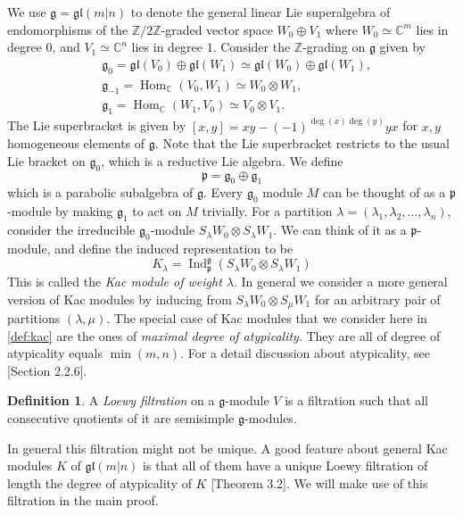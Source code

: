 \documentclass[12pt]{amsart}
\theoremstyle{definition}
\newtheorem{defn}[thm]{Definition}
\theoremstyle{remark}
\newcommand{\bbC}{\mathbb{C}}
\newcommand{\bbZ}{\mathbb{Z}}
\newcommand{\fg}{\mathfrak{g}}
\newcommand{\fp}{\mathfrak{p}}
\newcommand{\gl}{\mathfrak{gl}}
\newcommand{\Hom}{\operatorname{Hom}}
\newcommand{\Ind}{\operatorname{Ind}}
\numberwithin{equation}{section}
\begin{document}
We use $\fg = \gl(m|n)$ to denote the general linear Lie superalgebra of endomorphisms of the $\bbZ / 2 \bbZ$-graded vector space $W_0 \oplus V_1$ where $W_0 \simeq \bbC^m$ lies in degree $0$, and $V_1 \simeq \bbC^n$ lies in degree $1$. Consider the $\bbZ$-grading on $\fg$ given by
\begin{align*}
    & \fg_0 = \gl(V_0) \oplus \gl(W_1) \simeq \gl(W_0) \oplus \gl(W_1), \\
    & \fg_{-1} = \Hom_{\bbC}(V_0,W_1) \simeq W_0 \otimes W_1, \\
    & \fg_1 = \Hom_{\bbC}(W_1,V_0) \simeq V_0 \otimes V_1.
\end{align*}
The Lie superbracket is given by $[x,y] = xy - (-1)^{\deg(x)\deg(y)}yx$ for $x,y$ homogeneous elements of $\fg$. Note that the Lie superbracket restricts to the usual Lie bracket on $\fg_0$, which is a reductive Lie algebra. We define
\[
\fp = \fg_0 \oplus \fg_1
\]
which is a parabolic subalgebra of $\fg$. Every $\fg_0$ module $M$ can be thought of as a $\fp$-module by making $\fg_1$ to act on $M$ trivially. For a partition $\lambda = (\lambda_1,\lambda_2,\ldots,\lambda_n)$, consider the irreducible $\fg_0$-module $S_{\lambda} W_0 \otimes S_{\lambda} W_1$. We can think of it as a $\fp$-module, and define the induced representation to be
\begin{equation} \label{def:kac}
    K_{\lambda} = \Ind_{\fp}^{\fg}(S_{\lambda} W_0 \otimes S_{\lambda} W_1)
\end{equation}
This is called the \emph{Kac module of weight $\lambda$}. In general we consider a more general version of Kac modules by inducing from $S_{\lambda} W_0 \otimes S_{\mu} W_1 $ for an arbitrary pair of partitions $(\lambda,\mu)$. The special case of Kac modules that we consider here in \ref{def:kac} are the ones of \emph{maximal degree of atypicality}. They are all of degree of atypicality equals $\min (m,n)$. For a detail discussion about atypicality, see \cite{CW}[Section 2.2.6]. 

\begin{defn} \label{defn:Loewy}
A \emph{Loewy filtration} on a $\fg$-module $V$ is a filtration such that all consecutive quotients of it are semisimple $\fg$-modules.
\end{defn}
 In general this filtration might not be unique. A good feature about general Kac modules $K$ of $\gl(m|n)$ is that all of them have a unique Loewy filtration of length the degree of atypicality of $K$ \cite{SZ}[Theorem 3.2]. We will make use of this filtration in the main proof.
\end{document}
